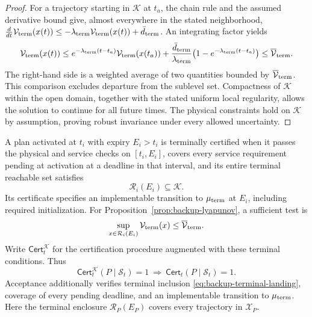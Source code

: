 \documentclass[preprint,12pt]{elsarticle}
\theoremstyle{definition}
\theoremstyle{plain}
\theoremstyle{definition}
\theoremstyle{plain}
\begin{document}
\begin{proof}
For a trajectory starting in $\mathcal K$ at $t_a$, the chain rule
and the assumed derivative bound give, almost everywhere in the stated
neighborhood,
$\frac{d}{dt}\mathcal V_{\rm term}(x(t))\le-\lambda_{\rm term} \mathcal V_{\rm term}(x(t))+\bar d_{\rm term}$.
An integrating factor yields
\[
 \mathcal V_{\rm term}(x(t))\le e^{-\lambda_{\rm term}(t-t_a)}\mathcal V_{\rm term}(x(t_a))+
 \frac{\bar d_{\rm term}}{\lambda_{\rm term}}\bigl(1-e^{-\lambda_{\rm term}(t-t_a)}\bigr)
 \le \overline{\mathcal V}_{\rm term}.
\]
The right-hand side is a weighted average of two quantities bounded by
$\overline{\mathcal V}_{\rm term}$. This comparison excludes departure from the sublevel set.
Compactness of $\mathcal K$ within the open domain, together with the
stated uniform local regularity, allows the solution to continue for
all future times. The physical constraints hold on $\mathcal K$ by
assumption, proving robust invariance under every allowed uncertainty.
\end{proof}

A plan activated at $t_i$ with expiry $E_i>t_i$ is terminally certified
when it passes the physical and service checks on $[t_i,E_i]$, covers
every service requirement pending at activation at a deadline in that interval,
and its entire terminal reachable set satisfies
\begin{equation}
\mathcal R_i(E_i)\subseteq\mathcal K.
\label{eq:backup-terminal-landing}
\end{equation}
Its certificate specifies an implementable transition to $\mu_{\rm term}$ at
$E_i$, including required initialization. For
Proposition~\ref{prop:backup-lyapunov}, a sufficient test is
\begin{equation}
\sup_{x\in\mathcal R_i(E_i)}\mathcal V_{\rm term}(x)\le \overline{\mathcal V}_{\rm term}.
\label{eq:backup-computable-landing}
\end{equation}
Write $\mathsf{Cert}^{\mathcal K}_t$ for the certification procedure augmented with
these terminal conditions. Thus
\begin{equation}
\mathsf{Cert}^{\mathcal K}_t(P\mid\mathcal S_t)=1
\ \Longrightarrow\ \mathsf{Cert}_t(P\mid\mathcal S_t)=1.
\label{eq:terminal-checker}
\end{equation}
Acceptance additionally verifies terminal inclusion
\eqref{eq:backup-terminal-landing}, coverage of every pending deadline,
and an implementable transition to $\mu_{\rm term}$. Here the terminal enclosure
$\mathcal R_P(E_P)$ covers every trajectory in $\mathcal X_P$.
\end{document}
